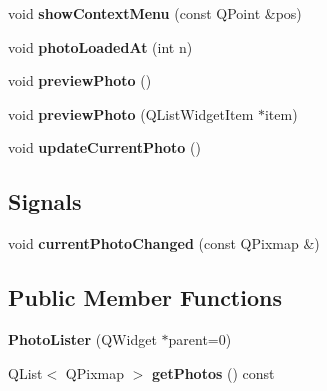 \begin{DoxyCompactItemize}
\item 
\hypertarget{class_photo_lister_a6e77c3c438ff073c23b02635735628ea}{
void {\bfseries showContextMenu} (const QPoint \&pos)}
\label{class_photo_lister_a6e77c3c438ff073c23b02635735628ea}

\item 
\hypertarget{class_photo_lister_ab186577203248411ecdb53c1760b7c72}{
void {\bfseries photoLoadedAt} (int n)}
\label{class_photo_lister_ab186577203248411ecdb53c1760b7c72}

\item 
\hypertarget{class_photo_lister_aa3e6dfa7d0dce9718107c714a20b8088}{
void {\bfseries previewPhoto} ()}
\label{class_photo_lister_aa3e6dfa7d0dce9718107c714a20b8088}

\item 
\hypertarget{class_photo_lister_a572671939e0b0ebf9cba671f6ba474b5}{
void {\bfseries previewPhoto} (QListWidgetItem $\ast$item)}
\label{class_photo_lister_a572671939e0b0ebf9cba671f6ba474b5}

\item 
\hypertarget{class_photo_lister_a7daad4a98cbf361b0107228cbb66e848}{
void {\bfseries updateCurrentPhoto} ()}
\label{class_photo_lister_a7daad4a98cbf361b0107228cbb66e848}

\end{DoxyCompactItemize}
\subsection*{Signals}
\begin{DoxyCompactItemize}
\item 
\hypertarget{class_photo_lister_af58c607f8074643383702173c6a61e08}{
void {\bfseries currentPhotoChanged} (const QPixmap \&)}
\label{class_photo_lister_af58c607f8074643383702173c6a61e08}

\end{DoxyCompactItemize}
\subsection*{Public Member Functions}
\begin{DoxyCompactItemize}
\item 
\hypertarget{class_photo_lister_ae3cf0ff67739d47a949a90344212360b}{
{\bfseries PhotoLister} (QWidget $\ast$parent=0)}
\label{class_photo_lister_ae3cf0ff67739d47a949a90344212360b}

\item 
\hypertarget{class_photo_lister_ac9af00759ab8e7e8af6d6d933766dad3}{
QList$<$ QPixmap $>$ {\bfseries getPhotos} () const }
\label{class_photo_lister_ac9af00759ab8e7e8af6d6d933766dad3}

\end{DoxyCompactItemize}

